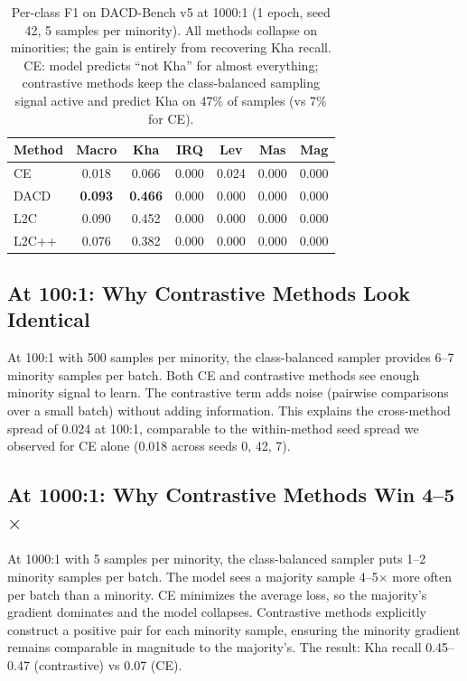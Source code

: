 \documentclass[11pt,a4paper,twocolumn]{article}
\newcommand{\method}{L2C}
\newcommand{\bench}{DACD-Bench}
\begin{document}
\begin{table}[t]
\centering
\small
\begin{tabular}{lcccccc}
\toprule
Method & Macro & Kha & IRQ & Lev & Mas & Mag \\
\midrule
CE       & 0.018 & 0.066 & 0.000 & 0.024 & 0.000 & 0.000 \\
DACD     & \textbf{0.093} & \textbf{0.466} & 0.000 & 0.000 & 0.000 & 0.000 \\
\method{} & 0.090 & 0.452 & 0.000 & 0.000 & 0.000 & 0.000 \\
L2C++    & 0.076 & 0.382 & 0.000 & 0.000 & 0.000 & 0.000 \\
\bottomrule
\end{tabular}
\caption{Per-class F1 on \bench{} v5 at 1000:1 (1 epoch, seed 42,
5 samples per minority). All methods collapse on minorities; the
gain is entirely from recovering Kha recall. CE: model predicts
``not Kha'' for almost everything; contrastive methods keep the
class-balanced sampling signal active and predict Kha on 47\% of
samples (vs 7\% for CE).}
\label{tab:perclass1000}
\end{table}

\subsection{At 100:1: Why Contrastive Methods Look Identical}
At 100:1 with 500 samples per minority, the class-balanced sampler
provides 6--7 minority samples per batch. Both CE and contrastive
methods see enough minority signal to learn. The contrastive term
adds noise (pairwise comparisons over a small batch) without adding
information. This explains the cross-method spread of 0.024 at
100:1, comparable to the within-method seed spread we observed for
CE alone (0.018 across seeds 0, 42, 7).

\subsection{At 1000:1: Why Contrastive Methods Win 4--5$\times$}
At 1000:1 with 5 samples per minority, the class-balanced sampler
puts 1--2 minority samples per batch. The model sees a majority
sample 4--5$\times$ more often per batch than a minority. CE
minimizes the average loss, so the majority's gradient dominates
and the model collapses. Contrastive methods explicitly construct
a positive pair for each minority sample, ensuring the minority
gradient remains comparable in magnitude to the majority's. The
result: Kha recall 0.45--0.47 (contrastive) vs 0.07 (CE).
\end{document}
